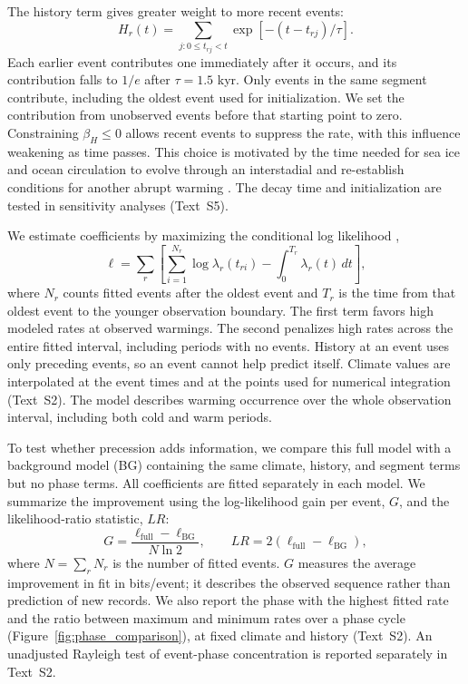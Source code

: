 \documentclass[11pt]{article}
\begin{document}
The history term gives greater weight to more recent events:
\begin{equation}
H_r(t)=\sum_{j:0\leq t_{rj}<t}\exp[-(t-t_{rj})/\tau].
\end{equation}
Each earlier event contributes one immediately after it occurs, and its contribution falls to $1/e$ after $\tau=1.5$ kyr. Only events in the same segment contribute, including the oldest event used for initialization. We set the contribution from unobserved events before that starting point to zero. Constraining $\beta_H\leq0$ allows recent events to suppress the rate, with this influence weakening as time passes. This choice is motivated by the time needed for sea ice and ocean circulation to evolve through an interstadial and re-establish conditions for another abrupt warming \citep{dokken2013dansgaard,vettoretti2022atmospheric}. The decay time and initialization are tested in sensitivity analyses (Text~S5).

We estimate coefficients by maximizing the conditional log likelihood \citep{daley2003introduction},
\begin{equation}
\ell=\sum_r\left[\sum_{i=1}^{N_r}\log\lambda_r(t_{ri})-\int_0^{T_r}\lambda_r(t)\,dt\right],\label{eq:likelihood}
\end{equation}
where $N_r$ counts fitted events after the oldest event and $T_r$ is the time from that oldest event to the younger observation boundary. The first term favors high modeled rates at observed warmings. The second penalizes high rates across the entire fitted interval, including periods with no events. History at an event uses only preceding events, so an event cannot help predict itself. Climate values are interpolated at the event times and at the points used for numerical integration (Text~S2). The model describes warming occurrence over the whole observation interval, including both cold and warm periods.

To test whether precession adds information, we compare this full model with a background model (BG) containing the same climate, history, and segment terms but no phase terms. All coefficients are fitted separately in each model. We summarize the improvement using the log-likelihood gain per event, $G$, and the likelihood-ratio statistic, $LR$:
\begin{equation}
G=\frac{\ell_{\mathrm{full}}-\ell_{\mathrm{BG}}}{N\ln2},\qquad
LR=2(\ell_{\mathrm{full}}-\ell_{\mathrm{BG}}),\label{eq:gain}
\end{equation}
where $N=\sum_r N_r$ is the number of fitted events. $G$ measures the average improvement in fit in bits/event; it describes the observed sequence rather than prediction of new records. We also report the phase with the highest fitted rate and the ratio between maximum and minimum rates over a phase cycle (Figure~\ref{fig:phase_comparison}), at fixed climate and history (Text~S2). An unadjusted Rayleigh test of event-phase concentration is reported separately in Text~S2.
\end{document}
